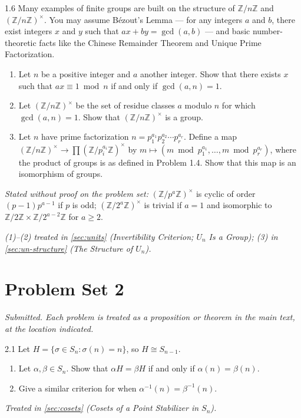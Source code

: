 \documentclass[11pt]{report}
\begin{document}
\begin{hwbox}{1.6}\label{hw:1.6}
Many examples of finite groups are built on the structure of $\mathbb{Z}/n\mathbb{Z}$ and $(\mathbb{Z}/n\mathbb{Z})^\times$. You may assume B\'ezout's Lemma --- for any integers $a$ and $b$, there exist integers $x$ and $y$ such that $ax + by = \gcd(a, b)$ --- and basic number-theoretic facts like the Chinese Remainder Theorem and Unique Prime Factorization.
\begin{enumerate}
    \item Let $n$ be a positive integer and $a$ another integer. Show that there exists $x$ such that $ax \equiv 1 \bmod n$ if and only if $\gcd(a, n) = 1$.
    \item Let $(\mathbb{Z}/n\mathbb{Z})^\times$ be the set of residue classes $a$ modulo $n$ for which $\gcd(a, n) = 1$. Show that $(\mathbb{Z}/n\mathbb{Z})^\times$ is a group.
    \item Let $n$ have prime factorization $n = p_1^{a_1} p_2^{a_2} \cdots p_r^{a_r}$. Define a map $(\mathbb{Z}/n\mathbb{Z})^\times \to \prod (\mathbb{Z}/p_i^{a_i}\mathbb{Z})^\times$ by $m \mapsto (m \bmod p_1^{a_1}, \ldots, m \bmod p_r^{a_r})$, where the product of groups is as defined in Problem 1.4. Show that this map is an isomorphism of groups.
\end{enumerate}
\textit{Stated without proof on the problem set:} $(\mathbb{Z}/p^a\mathbb{Z})^\times$ is cyclic of order $(p-1)p^{a-1}$ if $p$ is odd; $(\mathbb{Z}/2^a\mathbb{Z})^\times$ is trivial if $a = 1$ and isomorphic to $\mathbb{Z}/2\mathbb{Z} \times \mathbb{Z}/2^{a-2}\mathbb{Z}$ for $a \geq 2$.
\end{hwbox}
\textit{(1)--(2) treated in \ref{sec:units} (Invertibility Criterion; $U_n$ Is a Group); (3) in \ref{sec:un-structure} (The Structure of $U_n$).}

\section*{Problem Set 2}
{}

\textit{Submitted. Each problem is treated as a proposition or theorem in the main text, at the location indicated.}

\begin{hwbox}{2.1}\label{hw:2.1}
Let $H = \{\sigma \in S_n : \sigma(n) = n\}$, so $H \cong S_{n-1}$.
\begin{enumerate}
    \item Let $\alpha, \beta \in S_n$. Show that $\alpha H = \beta H$ if and only if $\alpha(n) = \beta(n)$.
    \item Give a similar criterion for when $\alpha^{-1}(n) = \beta^{-1}(n)$.
\end{enumerate}
\end{hwbox}
\textit{Treated in \ref{sec:cosets} (Cosets of a Point Stabilizer in $S_n$).}
\end{document}
